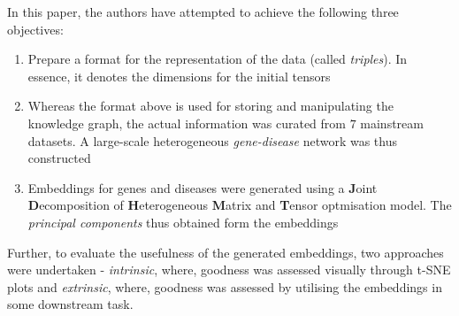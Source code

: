 \begin{sloppypar*}
    In this paper, the authors have attempted to achieve the following three
    objectives:
    \begin{enumerate}
        \item Prepare a format for the representation of the data (called \textit{triples}).
            In essence, it denotes the dimensions for the initial tensors
        \item Whereas the format above is used for storing and manipulating the
            knowledge graph, the actual information was curated from $7$ mainstream
            datasets. A large-scale heterogeneous \textit{gene-disease} network
            was thus constructed \cite{heteroData}
        \item Embeddings for genes and diseases were generated using a \textbf{J}oint
            \textbf{D}ecomposition of \textbf{H}eterogeneous \textbf{M}atrix
            and \textbf{T}ensor optmisation model. The \textit{principal components} 
            thus obtained form the embeddings
    \end{enumerate}
    
    \noindent Further, to evaluate the usefulness of the generated embeddings, two
    approaches were undertaken - \textit{intrinsic}, where, goodness was assessed
    visually through t-SNE plots and \textit{extrinsic}, where, goodness was assessed
    by utilising the embeddings in some downstream task.
\end{sloppypar*}